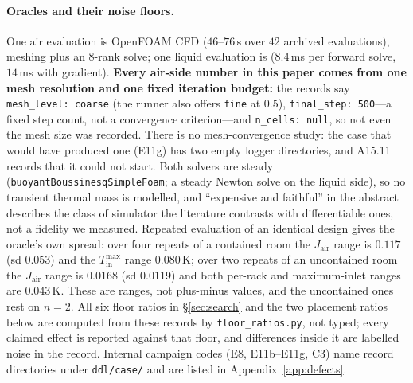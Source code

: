 \documentclass{article}
\newcommand{\Jair}{J_{\mathrm{air}}}
\begin{document}
\paragraph{Oracles and their noise floors.}
One air evaluation is OpenFOAM CFD ($46$--$76$\,s over $42$ archived evaluations),
meshing plus an 8-rank solve; one liquid evaluation is ($8.4$\,ms per forward solve,
$14$\,ms with gradient).  \textbf{Every air-side number in this paper comes from
one mesh resolution and one fixed iteration budget:} the records say
\texttt{mesh\_level: coarse} (the runner also offers \texttt{fine} at $0.5$),
\texttt{final\_step: 500}---a fixed step count, not a convergence criterion---and
\texttt{n\_cells: null}, so not even the mesh size was recorded.  There is no
mesh-convergence study: the case that would have produced one (E11g) has two empty logger
directories, and A15.11 records that it could not start.  Both solvers are steady
(\texttt{buoyantBoussinesqSimpleFoam}; a steady Newton solve on the liquid side), so no
transient thermal mass is modelled, and ``expensive and faithful'' in the abstract
describes the class of simulator the literature contrasts with differentiable ones, not a
fidelity we measured.  Repeated evaluation of an identical design gives the oracle's own
spread: over four repeats of a contained room the $\Jair$ range is $0.117$ (sd $0.053$)
and the $T^{\max}_{\mathrm{in}}$ range $0.080$\,K; over two repeats of an uncontained room
the $\Jair$ range is $0.0168$ (sd $0.0119$) and both per-rack and maximum-inlet ranges are
$0.043$\,K.  These are ranges, not plus-minus values, and the uncontained ones rest on
$n = 2$.  All six floor ratios in \S\ref{sec:search} and the two placement ratios below are
computed from these records by \texttt{floor\_ratios.py}, not typed; every claimed effect
is reported against that floor, and differences inside it are labelled noise in the
record.  Internal campaign codes (E8, E11b--E11g, C3) name record directories under
\texttt{ddl/case/} and are listed in Appendix~\ref{app:defects}.
\end{document}
